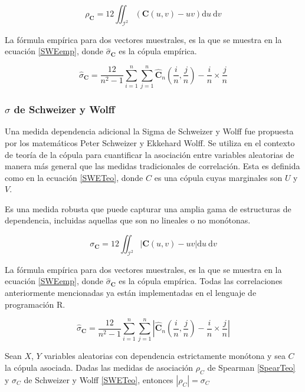 \begin{equation}\label{SpearTeo}
    \rho_{\mathbf{C}}=12 \iint_{\mathcal{I}^2} (\mathbf{C}(u, v)-u v) \mathrm{d} u \mathrm{~d} v
\end{equation}

La fórmula empírica para dos vectores muestrales, es la que se muestra en la ecuación \eqref{SWEemp}, donde $\hat{\sigma}_{\mathbf{C}}$ es la cópula empírica. 

\begin{equation}\label{Spearemp}
    \hat{\sigma}_{\mathbf{C}}=\frac{12}{n^2-1} \sum_{i=1}^n \sum_{j=1}^n\hat{\mathbf{C}}_n\left(\frac{i}{n}, \frac{j}{n}\right)-\frac{i}{n} \times \frac{j}{n}
\end{equation}
\subsubsection{$\sigma$ de Schweizer y Wolff}

Una medida dependencia adicional la Sigma de Schweizer y Wolff fue propuesta por los matemáticos Peter Schweizer y Ekkehard Wolff. Se utiliza en el contexto de teoría de la cópula para cuantificar la asociación entre variables aleatorias de manera más general que las medidas tradicionales de correlación. Esta es definida como en la ecuación \eqref{SWETeo}, donde $C$ es una cópula cuyas marginales son $U$ y $V$.

Es una medida robusta que puede capturar una amplia gama de estructuras de dependencia, incluidas aquellas que son no lineales o no monótonas. 

\begin{equation}\label{SWETeo}
    \sigma_{\mathbf{C}}=12 \iint_{\mathcal{I}^2}|\mathbf{C}(u, v)-u v| \mathrm{d} u \mathrm{~d} v
\end{equation}

La fórmula empírica para dos vectores muestrales, es la que se muestra en la ecuación \eqref{SWEemp}, donde $\hat{\sigma}_{\mathbf{C}}$ es la cópula empírica. Todas las correlaciones anteriormente mencionadas ya están implementadas en el lenguaje de programación R.

\begin{equation}\label{SWEemp}
    \hat{\sigma}_{\mathbf{C}}=\frac{12}{n^2-1} \sum_{i=1}^n \sum_{j=1}^n\left|\hat{\mathbf{C}}_n\left(\frac{i}{n}, \frac{j}{n}\right)-\frac{i}{n} \times \frac{j}{n}\right|
\end{equation}


\begin{propo}
    Sean $X$, $Y$ variables aleatorias con dependencia estrictamente monótona y sea $C$ la cópula asociada. Dadas las medidas de asociación $\rho_C$ de Spearman \eqref{SpearTeo} y $\sigma_C$ de Schweizer y Wolff \eqref{SWETeo}, entonces $|\rho_C| = \sigma_C$
\end{propo}

